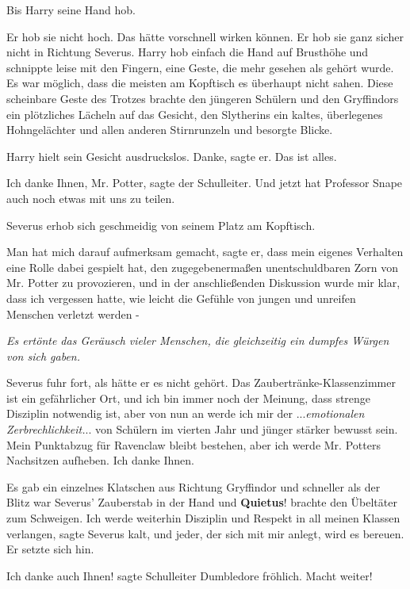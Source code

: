 Bis Harry seine Hand hob.

Er hob sie nicht hoch. Das hätte vorschnell wirken können. Er hob sie ganz
sicher nicht in Richtung Severus. Harry hob einfach die Hand auf Brusthöhe und
schnippte leise mit den Fingern, eine Geste, die mehr gesehen als gehört wurde.
Es war möglich, dass die meisten am Kopftisch es überhaupt nicht sahen. Diese
scheinbare Geste des Trotzes brachte den jüngeren Schülern und den Gryffindors
ein plötzliches Lächeln auf das Gesicht, den Slytherins ein kaltes, überlegenes
Hohngelächter und allen anderen Stirnrunzeln und besorgte Blicke.

Harry hielt sein Gesicht ausdruckslos. \glqq{}Danke\grqq{}, sagte er. \glqq{}Das
ist alles.\grqq{}

\glqq{}Ich danke Ihnen, Mr. Potter\grqq{}, sagte der Schulleiter. \glqq{}Und jetzt
hat Professor Snape auch noch etwas mit uns zu teilen.\grqq{}

Severus erhob sich geschmeidig von seinem Platz am Kopftisch.

\glqq{}Man hat mich darauf aufmerksam gemacht\grqq{}, sagte er, \glqq{}dass mein
eigenes Verhalten eine Rolle dabei gespielt hat, den zugegebenermaßen
unentschuldbaren Zorn von Mr. Potter zu provozieren, und in der anschließenden
Diskussion wurde mir klar, dass ich vergessen hatte, wie leicht die Gefühle von
jungen und unreifen Menschen verletzt werden -\grqq{}

\emph{Es ertönte das Geräusch vieler Menschen, die gleichzeitig ein dumpfes
Würgen von sich gaben.}

Severus fuhr fort, als hätte er es nicht gehört. \glqq{}Das
Zaubertränke-Klassenzimmer ist ein gefährlicher Ort, und ich bin immer noch der
Meinung, dass strenge Disziplin notwendig ist, aber von nun an werde ich mir
der ...\emph{emotionalen Zerbrechlichkeit.}.. von Schülern im vierten Jahr und
jünger stärker bewusst sein. Mein Punktabzug für Ravenclaw bleibt bestehen, aber
ich werde Mr. Potters Nachsitzen aufheben. Ich danke Ihnen.\grqq{}

Es gab ein einzelnes Klatschen aus Richtung Gryffindor und schneller als der
Blitz war Severus' Zauberstab in der Hand und \glqq{}\textbf{Quietus}!\grqq{}
brachte den Übeltäter zum Schweigen. \glqq{}Ich werde weiterhin Disziplin und
Respekt in all meinen Klassen verlangen\grqq{}, sagte Severus kalt, \glqq{}und
jeder, der sich mit mir anlegt, wird es bereuen.\grqq{} Er setzte sich hin.

\glqq{}Ich danke auch Ihnen!\grqq{} sagte Schulleiter Dumbledore fröhlich. \glqq{}
Macht weiter!\grqq{}

